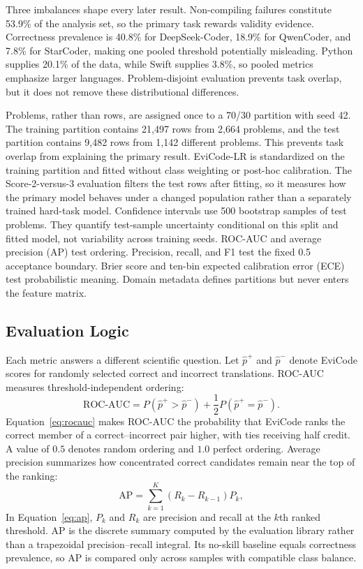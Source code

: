 \documentclass[conference]{IEEEtran}
\begin{document}
Three imbalances shape every later result. Non-compiling failures constitute 53.9\% of the analysis set, so the primary task rewards validity evidence. Correctness prevalence is 40.8\% for DeepSeek-Coder, 18.9\% for QwenCoder, and 7.8\% for StarCoder, making one pooled threshold potentially misleading. Python supplies 20.1\% of the data, while Swift supplies 3.8\%, so pooled metrics emphasize larger languages. Problem-disjoint evaluation prevents task overlap, but it does not remove these distributional differences.

Problems, rather than rows, are assigned once to a 70/30 partition with seed 42. The training partition contains 21,497 rows from 2,664 problems, and the test partition contains 9,482 rows from 1,142 different problems. This prevents task overlap from explaining the primary result. EviCode-LR is standardized on the training partition and fitted without class weighting or post-hoc calibration. The Score-2-versus-3 evaluation filters the test rows after fitting, so it measures how the primary model behaves under a changed population rather than a separately trained hard-task model. Confidence intervals use 500 bootstrap samples of test problems. They quantify test-sample uncertainty conditional on this split and fitted model, not variability across training seeds. ROC-AUC and average precision (AP) test ordering. Precision, recall, and F1 test the fixed 0.5 acceptance boundary. Brier score and ten-bin expected calibration error (ECE) test probabilistic meaning. Domain metadata defines partitions but never enters the feature matrix.

\subsection{Evaluation Logic}
Each metric answers a different scientific question. Let $\hat p^+$ and $\hat p^-$ denote EviCode scores for randomly selected correct and incorrect translations. ROC-AUC measures threshold-independent ordering:
\begin{equation}
\mathrm{ROC\mbox{-}AUC}=P(\hat p^+>\hat p^-)+\frac{1}{2}P(\hat p^+=\hat p^-).
\label{eq:rocauc}
\end{equation}
Equation~\ref{eq:rocauc} makes ROC-AUC the probability that EviCode ranks the correct member of a correct--incorrect pair higher, with ties receiving half credit. A value of $0.5$ denotes random ordering and $1.0$ perfect ordering. Average precision summarizes how concentrated correct candidates remain near the top of the ranking:
\begin{equation}
\mathrm{AP}=\sum_{k=1}^{K}(R_k-R_{k-1})P_k,
\label{eq:ap}
\end{equation}
In Equation~\ref{eq:ap}, $P_k$ and $R_k$ are precision and recall at the $k$th ranked threshold. AP is the discrete summary computed by the evaluation library rather than a trapezoidal precision--recall integral. Its no-skill baseline equals correctness prevalence, so AP is compared only across samples with compatible class balance.
\end{document}
